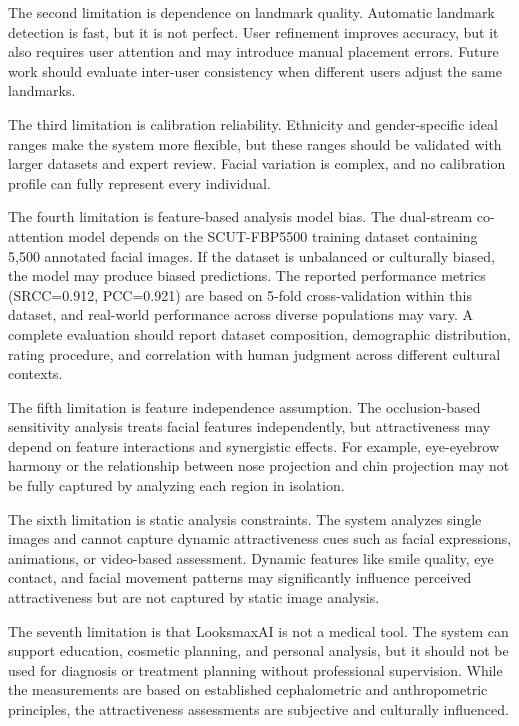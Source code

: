 The second limitation is dependence on landmark quality. Automatic landmark detection is fast, but it is not perfect. User refinement improves accuracy, but it also requires user attention and may introduce manual placement errors. Future work should evaluate inter-user consistency when different users adjust the same landmarks.

The third limitation is calibration reliability. Ethnicity and gender-specific ideal ranges make the system more flexible, but these ranges should be validated with larger datasets and expert review. Facial variation is complex, and no calibration profile can fully represent every individual.

The fourth limitation is feature-based analysis model bias. The dual-stream co-attention model depends on the SCUT-FBP5500 training dataset containing 5,500 annotated facial images. If the dataset is unbalanced or culturally biased, the model may produce biased predictions. The reported performance metrics (SRCC=0.912, PCC=0.921) are based on 5-fold cross-validation within this dataset, and real-world performance across diverse populations may vary. A complete evaluation should report dataset composition, demographic distribution, rating procedure, and correlation with human judgment across different cultural contexts.

The fifth limitation is feature independence assumption. The occlusion-based sensitivity analysis treats facial features independently, but attractiveness may depend on feature interactions and synergistic effects. For example, eye-eyebrow harmony or the relationship between nose projection and chin projection may not be fully captured by analyzing each region in isolation.

The sixth limitation is static analysis constraints. The system analyzes single images and cannot capture dynamic attractiveness cues such as facial expressions, animations, or video-based assessment. Dynamic features like smile quality, eye contact, and facial movement patterns may significantly influence perceived attractiveness but are not captured by static image analysis.

The seventh limitation is that LooksmaxAI is not a medical tool. The system can support education, cosmetic planning, and personal analysis, but it should not be used for diagnosis or treatment planning without professional supervision. While the measurements are based on established cephalometric and anthropometric principles, the attractiveness assessments are subjective and culturally influenced.

